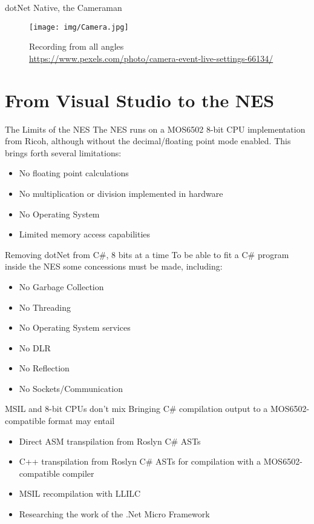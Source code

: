 \documentclass[10pt]{beamer}
\begin{document}
\begin{frame}{dotNet Native, the Cameraman}
    \begin{figure}
        \centering
        \texttt{[image: img/Camera.jpg]}
        \caption{Recording from all angles \\ \tiny{\href{Photo by Donald Tong from Pexels}{https://www.pexels.com/photo/camera-event-live-settings-66134/}}}
    \end{figure}
\end{frame}

\section{From Visual Studio to the NES}
\begin{frame}{The Limits of the NES}
The NES runs on a MOS6502 8-bit CPU implementation from Ricoh, although without the decimal/floating point mode enabled. This brings forth several limitations:
\begin{itemize}
    \item No floating point calculations
    \item No multiplication or division implemented in hardware
    \item No Operating System
    \item Limited memory access capabilities
\end{itemize}
\end{frame}

\begin{frame}{Removing dotNet from C\#, 8 bits at a time}
To be able to fit a C\# program inside the NES some concessions must be made, including:
\begin{itemize}
    \item No Garbage Collection
    \item No Threading
    \item No Operating System services
    \item No DLR
    \item No Reflection
    \item No Sockets/Communication
\end{itemize}
\end{frame}

\begin{frame}{MSIL and 8-bit CPUs don't mix}
Bringing C\# compilation output to a MOS6502-compatible format may entail
\begin{itemize}
    \item Direct ASM transpilation from Roslyn C\# ASTs
    \item C++ transpilation from Roslyn C\# ASTs for compilation with a MOS6502-compatible compiler
    \item MSIL recompilation with LLILC
    \item Researching the work of the .Net Micro Framework
\end{itemize}
\end{frame}
\end{document}
